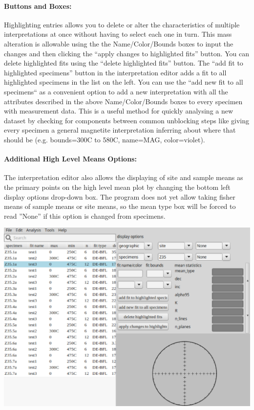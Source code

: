 \documentclass[11pt]{book}
\begin{document}
{{\paragraph{Buttons and Boxes:}\label{IE-buttons} Highlighting entries allows you to delete or alter the characteristics of multiple interpretations at once without having to select each one in turn. This mass alteration is allowable using the the Name/Color/Bounds boxes to input the changes and then clicking the ``apply changes to highlighted fits'' button. You can delete highlighted fits using the ``delete highlighted fits'' button. The ``add fit to highlighted specimens'' button in the interpretation editor adds a fit to all highlighted specimens in the list on the left. You can use the ``add new fit to all specimens`` as a convenient option to add a new interpretation with all the attributes described in the above Name/Color/Bounds boxes to every specimen with measurement data. This is a useful method for quickly analysing a new dataset by checking for components between common unblocking steps like giving every specimen a general magnetite interpretation inferring about where that should be (e.g. bounds=300C to 580C, name=MAG, color=violet).
\paragraph{Additional High Level Means Options:}\label{IE-HLM-options} The interpretation editor also allows the displaying of site and sample means as the primary points on the high level mean plot by changing the bottom left display options drop-down box. The program does not yet allow taking fisher means of sample means or site means, so the mean type box will be forced to read ''None'' if this option is changed from specimens.

\includegraphics[width=15 cm]{EPSFiles/demag_gui_InterpEditor.eps}

}}
\end{document}

